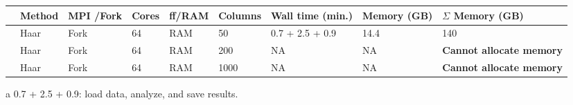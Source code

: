 \documentclass[a4paper,11pt]{article}
\newcounter{magicrownumbers}
\newcommand\rownumber{\stepcounter{magicrownumbers}\arabic{magicrownumbers}}
\begin{document}
\begin{center}
  
\begin{threeparttable}

  \caption{Time and memory usage of segmentation with default options}    
  \begin{tabular}{lp{1.2cm}p{1.0cm}p{1.0cm}p{1.1cm}p{1.35cm}p{3.0cm}p{1.6cm}p{1.6cm}}

    \hline\hline

&Method& MPI /Fork & Cores & ff/RAM & Columns & Wall time (min.) & Memory (GB) & $\Sigma$ Memory (GB)\\

\hline
\rownumber&Haar & Fork &64  & RAM & 50 & 0.7 + 2.5 + 0.9\tnote{a}& 14.4 & 140\\
\rownumber&Haar & Fork &64  & RAM & 200 & NA & NA & \textbf{Cannot allocate memory}\\
\rownumber&Haar & Fork &64  & RAM & 1000 & NA & NA & \textbf{Cannot allocate memory} \\
\hline
   
  \end{tabular}

  \begin{tablenotes}
    {\footnotesize

    \item[a] 0.7 + 2.5 + 0.9: load data, analyze, and save results.
    }
  \end{tablenotes}

\end{threeparttable}
\end{center}
\end{document}
